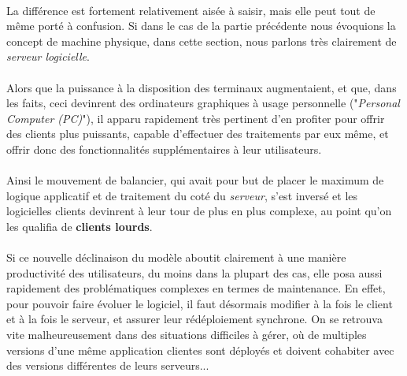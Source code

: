{  \paragraph{} La différence est fortement relativement aisée à saisir, mais elle peut tout de même
  porté à confusion. Si dans le cas de la partie précédente nous évoquions la concept de machine
  physique, dans cette section, nous parlons très clairement de \textit{serveur logicielle}.

  \paragraph{} Alors que la puissance à la disposition des terminaux augmentaient, et que, dans les
  faits, ceci devinrent des ordinateurs graphiques à usage personnelle ("\textit{Personal Computer
  (PC)}"), il apparu rapidement très pertinent d'en profiter pour offrir des clients plus puissants,
  capable d'effectuer des traitements par eux même, et offrir donc des fonctionnalités
  supplémentaires à leur utilisateurs.

  \paragraph{} Ainsi le mouvement de balancier, qui avait pour but de placer le maximum de logique
  applicatif et de traitement du coté du \textit{serveur}, s'est inversé et les logicielles clients
  devinrent à leur tour de plus en plus complexe, au point qu'on les qualifia de \textbf{clients
  lourds}.

  \paragraph{} Si ce nouvelle déclinaison du modèle aboutit clairement à une manière productivité
  des utilisateurs, du moins dans la plupart des cas, elle posa aussi rapidement des problématiques
  complexes en termes de maintenance. En effet, pour pouvoir faire évoluer le logiciel, il faut
  désormais modifier à la fois le client et à la fois le serveur, et assurer leur rédéploiement
  synchrone. On se retrouva vite malheureusement dans des situations difficiles à gérer, où de
  multiples versions d'une même application clientes sont déployés et doivent cohabiter avec des
  versions différentes de leurs serveurs...
}



